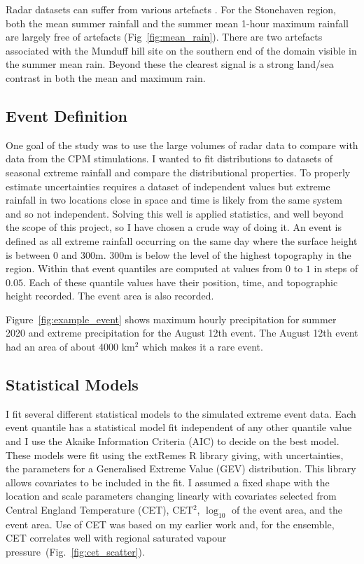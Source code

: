 \documentclass[11pt,a4paper]{article}
\begin{document}
Radar datasets can suffer from various artefacts \parencite{artefacts}.
For the Stonehaven region, both the mean summer rainfall and the summer mean 1-hour maximum rainfall are largely free of artefacts (Fig~\ref{fig:mean_rain}). There are two artefacts associated with the Munduff hill site on the southern end of the domain visible in the summer mean rain. Beyond these the clearest signal is a strong land/sea contrast in both the mean and maximum rain. 

\subsection{Event Definition}

One goal of the study was to use the large volumes of radar data to compare with data from the CPM stimulations. I  wanted  to fit distributions to  datasets of seasonal extreme rainfall and compare the distributional properties. To properly estimate uncertainties requires a dataset of independent values but extreme rainfall in two locations close in space and time is likely from the same system and so not independent. Solving this  well is applied statistics, and well beyond the scope of this project, so I have chosen a crude way of doing it.  An event is defined as all extreme rainfall occurring on the same day where the surface height is between 0 and 300m. 300m is below the level of the highest topography in the region. Within that event quantiles are computed at values from $0$ to $1$ in steps of $0.05$. Each of these quantile values have their position, time, and topographic height recorded. The event area is also recorded. 

Figure~\ref{fig:example_event} shows maximum hourly precipitation for summer 2020 and  extreme precipitation for the August 12th event. The August 12th event had an area of about 4000 km$^2$ which makes it a rare event. 


\subsection{Statistical Models}

I fit several different statistical models to the simulated  extreme event data. Each event quantile has a  statistical model fit independent of any other quantile value and I use the Akaike Information Criteria (AIC) to decide on the best model\parencite{akaike74aic}. These models were fit using the extRemes R library\parencite{gilleland2016extremes} giving, with uncertainties, the parameters for a Generalised Extreme Value (GEV) distribution.   This library allows covariates to be included in the fit. I assumed a fixed shape with the location and scale parameters changing linearly with covariates selected from  Central England Temperature (CET), CET$^2$,  $\log_{10}$ of the event area, and the event area.  Use of CET was based on my earlier work\parencite{Tett2023} and, for the ensemble, CET correlates well with regional saturated vapour pressure~(Fig.~\ref{fig:cet_scatter}). 
\end{document}
